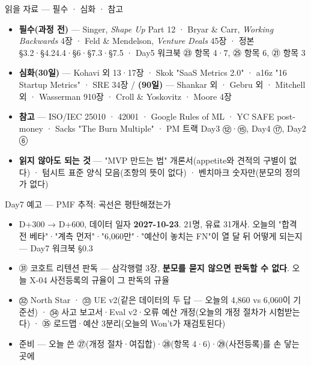 \begin{frame}{읽을 자료 — 필수 · 심화 · 참고}
\begin{itemize}
\item \textbf{필수(과정 전)} — Singer, \emph{Shape Up} Part 1\til{}2 · Bryar \& Carr, \emph{Working Backwards} 4장 · Feld \& Mendelson, \emph{Venture Deals} 4\til{}5장 · 정본 §3.2·§4.2\til{}4.4·§6·§7.3·§7.5 · Day5 워크북 ㉓ 항목 4·7, ㉕ 항목 6, ㉑ 항목 3
\item \textbf{심화(30일)} — Kohavi 외 1\til{}3·17장 · Skok "SaaS Metrics 2.0" · a16z "16 Startup Metrics" · SRE 3\til{}4장 / \textbf{(90일)} — Shankar 외 · Gebru 외 · Mitchell 외 · Wasserman 9\til{}10장 · Croll \& Yoskovitz · Moore 4장
\item \textbf{참고} — ISO/IEC 25010 · 42001 · Google Rules of ML · YC SAFE post-money · Sacks "The Burn Multiple" · PM 트랙 Day3 ⑫·⑮, Day4 ⑰, Day2 ⑥
\item \textbf{읽지 않아도 되는 것} — "MVP 만드는 법" 개론서(appetite와 견적의 구별이 없다) · 텀시트 표준 양식 모음(조항의 뜻이 없다) · 벤치마크 숫자만(분모의 정의가 없다)
\end{itemize}
\end{frame}

\begin{frame}{Day7 예고 — PMF 추적: 곡선은 평탄해졌는가}
\begin{itemize}
\item D+300 → D+600, 데이터 일자 \textbf{2027-10-23}. 21명, 유료 31개사. 오늘의 "합격 전 베타"·"계측 먼저"·"6,060만"·"예산이 놓치는 FN"이 열 달 뒤 어떻게 되는지 — Day7 워크북 §0.3
\item ㉛ 코호트 리텐션 판독 — 삼각행렬 3장, \textbf{분모를 묻지 않으면 판독할 수 없다}. 오늘 X-04 사전등록의 규율이 그 판독의 규율
\item ㉜ North Star · ㉝ UE v2(같은 데이터의 두 답 — 오늘의 4,860 vs 6,060이 기준선) · ㉞ 사고 보고서·Eval v2·오류 예산 개정(오늘의 개정 절차가 시험받는다) · ㉟ 로드맵·예산 3분리(오늘의 Won't가 재검토된다)
\item 준비 — 오늘 쓴 ㉗(개정 절차·여집합)·㉘(항목 4·6)·㉙(사전등록)를 손 닿는 곳에
\end{itemize}
\end{frame}

